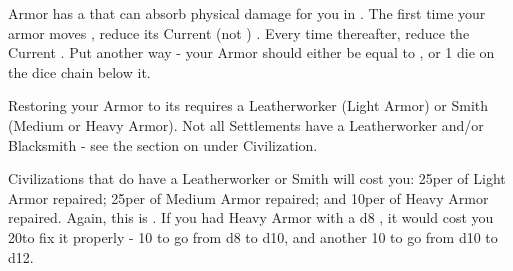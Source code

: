 {\begin{multicols}{2}
\cbreak


\end{multicols}





\newpage




Armor has a \UD that can absorb physical damage for you in .  The first time your armor moves \DCDOWN, reduce its Current (not \MAX) \UD.  Every time thereafter, reduce  the Current  \MAX \UD. Put another way - your Armor should either be equal to \MAX, or 1 die on the dice chain below it.

  
  Restoring your Armor to its \MAX \UD requires a Leatherworker (Light Armor) or Smith (Medium or Heavy Armor).  Not all Settlements have a Leatherworker and/or Blacksmith - see the section on  under Civilization.

  Civilizations that do have a Leatherworker or Smith will cost you:  25\FE per \UD of Light Armor repaired; 25\AG per \UD of Medium Armor repaired; and 10\AU per \UD of Heavy Armor repaired.  Again, this is  \UD.  If you had Heavy Armor with a d8 \MAX, it would cost you 20\AU to fix it properly - 10 \AU to go from d8 to d10, and another 10 to go from d10 to d12.


}
